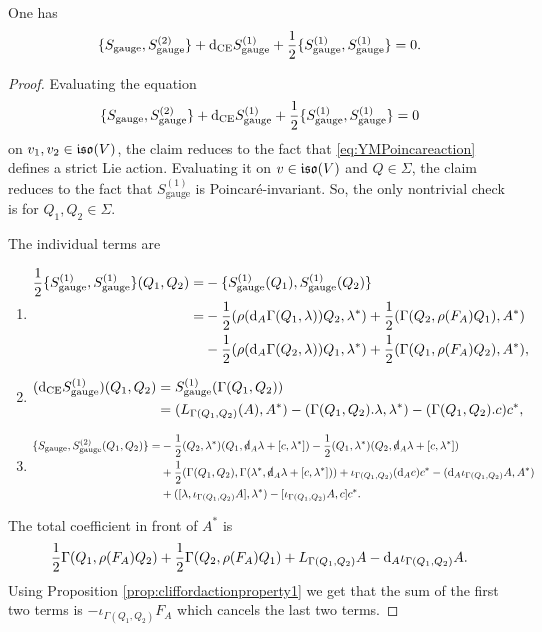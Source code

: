 \documentclass[10pt, oneside]{article}
\newcommand{\gauge}{\mathrm{gauge}}
\begin{document}
\begin{lemma}
One has
\[\{S_{\gauge}, S_{\gauge}^{(2)}\} + \d_{\mr{CE}} S_{\gauge}^{(1)} + \frac{1}{2}\{S_{\gauge}^{(1)}, S_{\gauge}^{(1)}\} = 0.\]
\label{lm:gaugemultiplet2}
\end{lemma}
\begin{proof}
Evaluating the equation
\[\{S_{\gauge}, S_{\gauge}^{(2)}\} + \d_{\mr{CE}} S_{\gauge}^{(1)} + \frac{1}{2}\{S_{\gauge}^{(1)}, S_{\gauge}^{(1)}\} = 0\]
on $v_1, v_2\in \mathfrak{iso}(V)$, the claim reduces to the fact that \eqref{eq:YMPoincareaction} defines a strict Lie action. Evaluating it on $v\in\mathfrak{iso}(V)$ and $Q\in\Sigma$, the claim reduces to the fact that $S_{\gauge}^{(1)}$ is Poincar\'{e}-invariant. So, the only nontrivial check is for $Q_1,Q_2\in\Sigma$.

The individual terms are
\begin{enumerate}
\item\begin{align*}
\frac{1}{2}\{S_{\gauge}^{(1)}, S_{\gauge}^{(1)}\}(Q_1, Q_2) = &-\{S_{\gauge}^{(1)}(Q_1), S_{\gauge}^{(1)}(Q_2)\} \\
= &-\frac{1}{2}(\rho(\d_A \Gamma(Q_1, \lambda)) Q_2, \lambda^*) + \frac{1}{2}(\Gamma(Q_2, \rho(F_A)Q_1), A^*) \\
&-\frac{1}{2}(\rho(\d_A \Gamma(Q_2, \lambda)) Q_1, \lambda^*) + \frac{1}{2}(\Gamma(Q_1, \rho(F_A)Q_2), A^*),
\end{align*}
\item\begin{align*}
(\d_{\mr{CE}} S_{\gauge}^{(1)})(Q_1, Q_2) &= S_{\gauge}^{(1)}(\Gamma(Q_1, Q_2)) \\
&= (L_{\Gamma(Q_1, Q_2)}(A), A^*) -(\Gamma(Q_1, Q_2).\lambda, \lambda^*) - (\Gamma(Q_1, Q_2).c) c^*,
\end{align*}
\item 
\begin{align*}
\{S_{\gauge}, S_{\gauge}^{(2)}(Q_1, Q_2)\} = &-\frac{1}{2}(Q_2, \lambda^*)(Q_1, \sd{\d}_A \lambda + [c, \lambda^*]) - \frac{1}{2}(Q_1, \lambda^*)(Q_2, \sd{\d}_A \lambda + [c, \lambda^*]) \\
&+\frac{1}{2}(\Gamma(Q_1, Q_2), \Gamma(\lambda^*, \sd{\d}_A \lambda + [c, \lambda^*])) + \iota_{\Gamma(Q_1, Q_2)}(\d_A c) c^* - (\d_A\iota_{\Gamma(Q_1, Q_2)} A, A^*) \\
&+ ([\lambda, \iota_{\Gamma(Q_1, Q_2)}A], \lambda^*) - [\iota_{\Gamma(Q_1, Q_2)} A, c] c^*.
\end{align*}
\end{enumerate}
The total coefficient in front of $A^*$ is
\[\frac{1}{2}\Gamma(Q_1, \rho(F_A)Q_2) + \frac{1}{2}\Gamma(Q_2, \rho(F_A) Q_1) + L_{\Gamma(Q_1, Q_2)} A - {\rm d}_A \iota_{\Gamma(Q_1, Q_2)} A.\]
Using Proposition \ref{prop:cliffordactionproperty1} we get that the sum of the first two terms is $-\iota_{\Gamma(Q_1, Q_2)}F_A$ which cancels the last two terms.


\end{proof}
\end{document}
